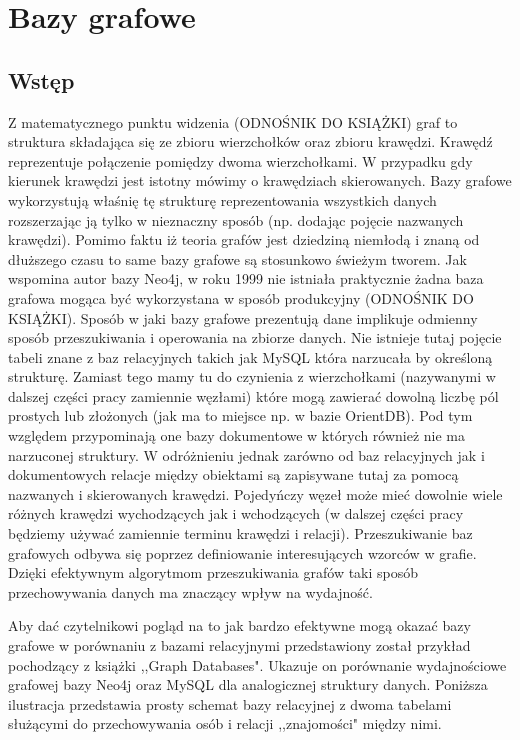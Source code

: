 \documentclass[brudnopis]{xmgr}
\begin{document}
\chapter{Bazy grafowe}

\section{Wstęp}

Z matematycznego punktu widzenia (ODNOŚNIK DO KSIĄŻKI) graf to struktura składająca się ze zbioru wierzchołków oraz zbioru krawędzi. Krawędź reprezentuje połączenie pomiędzy dwoma wierzchołkami. W przypadku gdy kierunek krawędzi jest istotny mówimy o krawędziach skierowanych. Bazy grafowe wykorzystują właśnię tę strukturę reprezentowania wszystkich danych rozszerzając ją tylko w nieznaczny sposób (np. dodając pojęcie nazwanych krawędzi). Pomimo faktu iż teoria grafów jest dziedziną niemłodą i znaną od dłuższego czasu to same bazy grafowe są stosunkowo świeżym tworem. Jak wspomina autor bazy Neo4j, w roku 1999 nie istniała praktycznie żadna baza grafowa mogąca być wykorzystana w sposób produkcyjny (ODNOŚNIK DO KSIĄŻKI). Sposób w jaki bazy grafowe prezentują dane implikuje odmienny sposób przeszukiwania i operowania na zbiorze danych. Nie istnieje tutaj pojęcie tabeli znane z baz relacyjnych takich jak MySQL która narzucała by określoną strukturę. Zamiast tego mamy tu do czynienia z wierzchołkami (nazywanymi w dalszej części pracy zamiennie węzłami) które mogą zawierać dowolną liczbę pól prostych lub złożonych (jak ma to miejsce np. w bazie OrientDB). Pod tym względem przypominają one bazy dokumentowe w których również nie ma narzuconej struktury. W odróżnieniu jednak zarówno od baz relacyjnych jak i dokumentowych relacje między obiektami są zapisywane tutaj za pomocą nazwanych i skierowanych krawędzi. Pojedyńczy węzeł może mieć dowolnie wiele różnych krawędzi wychodzących jak i wchodzących (w dalszej części pracy będziemy używać zamiennie terminu krawędzi i relacji). Przeszukiwanie baz grafowych odbywa się poprzez definiowanie interesujących wzorców w grafie. Dzięki efektywnym algorytmom przeszukiwania grafów taki sposób przechowywania danych ma znaczący wpływ na wydajność.

Aby dać czytelnikowi pogląd na to jak bardzo efektywne mogą okazać bazy grafowe w porównaniu z bazami relacyjnymi przedstawiony został przykład pochodzący z książki ,,Graph Databases". Ukazuje on porównanie wydajnościowe grafowej bazy Neo4j oraz MySQL dla analogicznej struktury danych. Poniższa ilustracja przedstawia prosty schemat bazy relacyjnej z dwoma tabelami służącymi do przechowywania osób i relacji ,,znajomości" między nimi.
\end{document}
